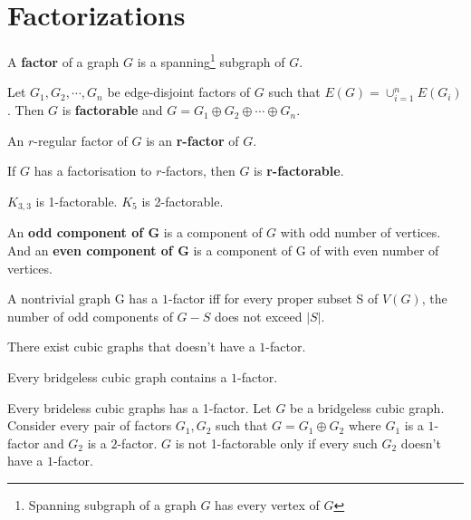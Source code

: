 \section{Factorizations}
\begin{definition}
	A \textbf{factor} of a graph $G$ is a spanning\footnote{Spanning subgraph of a graph $G$ has every vertex of $G$} subgraph of $G$.
\end{definition}

\begin{definition}
	Let $G_1, G_2, \cdots, G_n$ be edge-disjoint factors of $G$ such that $E(G) = \cup_{i = 1}^n E(G_i)$. Then $G$ is \textbf{factorable} and $G = G_1 \oplus G_2 \oplus \cdots \oplus G_n$.
\end{definition}

\begin{definition}
	An $r$-regular factor of $G$ is an \textbf{r-factor} of $G$.
\end{definition}

\begin{definition}
	If $G$ has a factorisation to $r$-factors, then $G$ is \textbf{r-factorable}.
\end{definition}

\begin{remark}
	$K_{3,3}$ is 1-factorable. $K_5$ is 2-factorable.
\end{remark}

\begin{definition}
	An \textbf{odd component of G} is a component of $G$ with odd number of vertices. And an \textbf{even component of G} is a component of G of with even number of vertices.
\end{definition}

\begin{theorem}[Tutte]
	A nontrivial graph G has a $1$-factor iff for every proper subset S of $V(G)$, the number of odd components of $G-S$ does not exceed $|S|$.
\end{theorem}

\begin{remark}
	There exist cubic graphs that doesn't have a $1$-factor.
\end{remark}

\begin{theorem}[Petersen]
	Every bridgeless cubic graph contains a $1$-factor.
\end{theorem}

\begin{remark}
	Every brideless cubic graphs has a 1-factor. Let $G$ be a bridgeless cubic graph. Consider every pair of factors $G_1, G_2$ such that $G = G_1 \oplus G_2$ where $G_1$ is a $1$-factor and $G_2$ is a $2$-factor. $G$ is not 1-factorable only if every such $G_2$ doesn't have a $1$-factor.
\end{remark}

